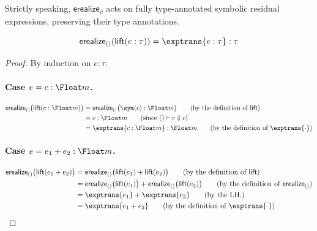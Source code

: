 Strictly speaking, $\mathsf{erealize}_\rho$ acts on fully type-annotated symbolic residual expressions, preserving their type annotations.

\begin{lemma}\label{lem:erealize-lift}
  \[
    \mathsf{erealize}_{()}(\mathsf{lift}(e : \tau)) = \exptrans{e : \tau} : \tau
  \]
\end{lemma}

\begin{proof}
  By induction on $e : \tau$.

  \paragraph{Case $e=c:\Float m$.}
  \begin{align*}
    \mathsf{erealize}_{()}
    \bigl(\mathsf{lift}(c:\Float m)\bigr)
    &=
    \mathsf{erealize}_{()}
    \bigl(\sym(c):\Float m\bigr)
    \tag{by the definition of $\mathsf{lift}$}
    \\
    &=
    c:\Float m
    \tag{since $()\vdash c\Downarrow c$}
    \\
    &=
    \exptrans{c:\Float m}:\Float m
    \tag{by the definition of $\exptrans{\cdot}$}
  \end{align*}

  \paragraph{Case $e=e_1+e_2:\Float m$.}
  \begin{align*}
    \mathsf{erealize}_{()}
    \bigl(\mathsf{lift}(e_1+e_2)\bigr)
    &=
    \mathsf{erealize}_{()}
    \bigl(
      \mathsf{lift}(e_1)+\mathsf{lift}(e_2)
    \bigr)
    \tag{by the definition of $\mathsf{lift}$}
    \\
    &=
    \mathsf{erealize}_{()}\bigl(\mathsf{lift}(e_1)\bigr)
    +
    \mathsf{erealize}_{()}\bigl(\mathsf{lift}(e_2)\bigr)
    \tag{by the definition of $\mathsf{erealize}_{()}$}
    \\
    &=
    \exptrans{e_1}+\exptrans{e_2}
    \tag{by the I.H.}
    \\
    &=
    \exptrans{e_1+e_2}
    \tag{by the definition of $\exptrans{\cdot}$}
  \end{align*}


\end{proof}
